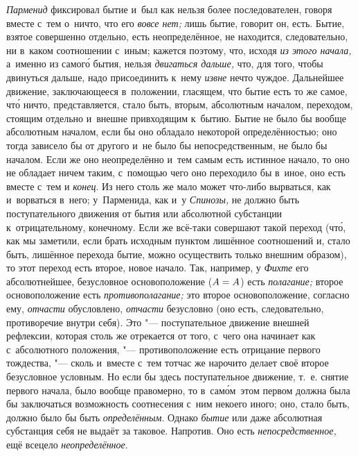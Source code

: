{\em Парменид} фиксировал бытие и~был как нельзя более последователен, говоря
вместе с~тем о~ничто, что его {\em вовсе нет;} лишь бытие, говорит он, есть.
Бытие, взятое совершенно отдельно, есть неопределённое, не находится,
следовательно, ни в~каком соотношении с~иным; кажется поэтому, что, исходя
{\em из этого начала,} а~именно из самог\'{о} бытия,
нельзя {\em двигаться дальше,} что, для того,
чтобы двинуться дальше, надо присоединить к~нему {\em извне} нечто чуждое.
Дальнейшее движение, заключающееся в~положении, гласящем, что бытие есть то же
самое, чт\'{о} ничто, представляется, стало быть, вторым, абсолютным началом,
переходом, стоящим отдельно и~внешне привходящим к~бытию. Бытие не было бы
вообще абсолютным началом, если бы оно обладало некоторой определённостью; оно
тогда зависело бы от другого и~не было бы непосредственным, не было бы началом.
Если же оно неопределённо и~тем самым есть истинное начало, то оно не обладает
ничем таким, с~помощью чего оно переходило бы в~иное, оно есть вместе с~тем и
{\em конец}. Из него столь же мало может что-либо вырваться, как и~ворваться
в~него; у~Парменида, как и~у {\em Спинозы,} не должно быть поступательного
движения от бытия или абсолютной субстанции к~отрицательному, конечному. Если
же всё-таки совершают такой переход (чт\'{о}, как мы заметили, если брать
исходным пунктом лишённое соотношений и, стало быть, лишённое перехода бытие,
можно осуществить только внешним образом), то этот переход есть второе, новое
начало. Так, например, у {\em Фихте} его абсолютнейшее, безусловное
основоположение ($A\hm=A$) есть {\em полагание;} второе основоположение есть
{\em противополагание;} это второе основоположение, согласно ему, {\em отчасти}
обусловлено, {\em отчасти} безусловно (оно есть, следовательно, противоречие
внутри себя). Это "--- поступательное движение внешней рефлексии, которая столь
же отрекается от того, с~чего она начинает как с~абсолютного положения, "---
противоположение есть отрицание первого тождества, "--- сколь и~вместе с~тем
тотчас же нарочито делает своё второе безусловное условным. Но если бы здесь
поступательное движение, т.~е. снятие первого начала, было вообще правомерно,
то в~сам\'{о}м~этом первом должна была бы заключаться возможность соотнесения
с~ним некоего иного; оно, стало быть, должно было бы быть {\em определённым}.
Однако {\em бытие} или даже абсолютная субстанция себя не выдаёт за таковое.
Напротив. Оно есть {\em непосредственное,} ещё всецело {\em неопределённое}.

